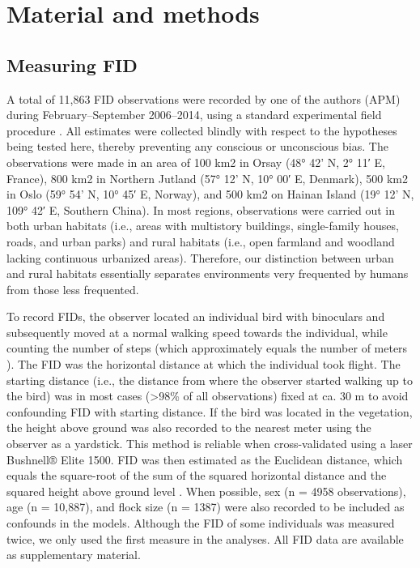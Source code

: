 \section{Material and methods}

\subsection*{Measuring FID}

A total of 11,863 FID observations were recorded by one of
the authors (APM) during February–September 2006–2014,
using a standard experimental field procedure \citep{hediger1934biologie, hemmingsen1951relation, Blumstein2006}. 
All estimates were collected
blindly with respect to the hypotheses being tested here,
thereby preventing any conscious or unconscious bias. The
observations were made in an area of 100 km2 in Orsay (48°
42’ N, 2° 11′ E, France), 800 km2 in Northern Jutland (57° 12’
N, 10° 00′ E, Denmark), 500 km2 in Oslo (59° 54’ N, 10° 45′
E, Norway), and 500 km2 on Hainan Island (19° 12’ N, 109°
42′ E, Southern China). In most regions, observations were
carried out in both urban habitats (i.e., areas with multistory
buildings, single-family houses, roads, and urban parks) and
rural habitats (i.e., open farmland and woodland lacking continuous
urbanized areas). Therefore, our distinction between
urban and rural habitats essentially separates environments
very frequented by humans from those less frequented.

To record FIDs, the observer located an individual bird
with binoculars and subsequently moved at a normal walking
speed towards the individual, while counting the number of
steps (which approximately equals the number of meters
\citep{Moller2008}). The FID was the horizontal distance at which
the individual took flight. The starting distance (i.e., the distance
from where the observer started walking up to the bird)
was in most cases (\textgreater{98\%} of all observations) fixed at ca. 30 m
to avoid confounding FID with starting distance. If the bird
was located in the vegetation, the height above ground was
also recorded to the nearest meter using the observer as a
yardstick. This method is reliable when cross-validated using
a laser Bushnell® Elite 1500. FID was then estimated as the
Euclidean distance, which equals the square-root of the sum of
the squared horizontal distance and the squared height above
ground level \citep{Blumstein2006}. When possible, sex (n = 4958
observations), age (n = 10,887), and flock size (n = 1387)
were also recorded to be included as confounds in the models.
Although the FID of some individuals was measured twice,
we only used the first measure in the analyses. All FID data
are available as supplementary material.


